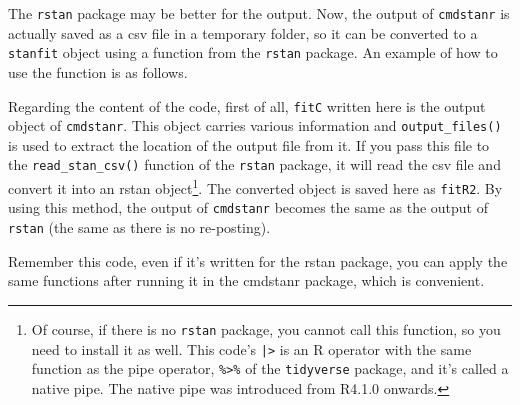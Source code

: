 \documentclass{ltjsbook}
\begin{document}
The \verb|rstan| package may be better for the output. Now, the output of \verb|cmdstanr| is actually saved as a csv file in a temporary folder, so it can be converted to a \verb|stanfit| object using a function from the \verb|rstan| package. An example of how to use the function is as follows.



Regarding the content of the code, first of all, \verb|fitC| written here is the output object of \verb|cmdstanr|. This object carries various information and \verb|output_files()| is used to extract the location of the output file from it. If you pass this file to the \verb|read_stan_csv()| function of the \verb|rstan| package, it will read the csv file and convert it into an rstan object\footnote{Of course, if there is no \verb|rstan| package, you cannot call this function, so you need to install it as well. This code's \texttt{|>} is an R operator with the same function as the pipe operator, \verb|%>%| of the \verb|tidyverse| package, and it's called a native pipe. The native pipe was introduced from R4.1.0 onwards.}. The converted object is saved here as \verb|fitR2|. By using this method, the output of \verb|cmdstanr| becomes the same as the output of \verb|rstan| (the same as there is no re-posting).

Remember this code, even if it's written for the rstan package, you can apply the same functions after running it in the cmdstanr package, which is convenient.
\end{document}
